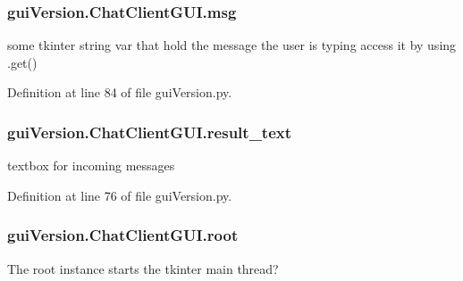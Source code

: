 \hypertarget{classgui_version_1_1_chat_client_g_u_i_a44a52021282a7dc6c04aa10b77d829e9}{}
\subsubsection[{msg}]{\setlength{\rightskip}{0pt plus 5cm}gui\+Version.\+Chat\+Client\+G\+U\+I.\+msg}\label{classgui_version_1_1_chat_client_g_u_i_a44a52021282a7dc6c04aa10b77d829e9}


some tkinter string var that hold the message the user is typing access it by using .get() 



Definition at line 84 of file gui\+Version.\+py.

\hypertarget{classgui_version_1_1_chat_client_g_u_i_aed7ce16822dd2da856987bb7dbca00f7}{}
\subsubsection[{result\+\_\+text}]{\setlength{\rightskip}{0pt plus 5cm}gui\+Version.\+Chat\+Client\+G\+U\+I.\+result\+\_\+text}\label{classgui_version_1_1_chat_client_g_u_i_aed7ce16822dd2da856987bb7dbca00f7}


textbox for incoming messages 



Definition at line 76 of file gui\+Version.\+py.

\hypertarget{classgui_version_1_1_chat_client_g_u_i_afec7497b20c1d133c5c026c9625a1691}{}
\subsubsection[{root}]{\setlength{\rightskip}{0pt plus 5cm}gui\+Version.\+Chat\+Client\+G\+U\+I.\+root}\label{classgui_version_1_1_chat_client_g_u_i_afec7497b20c1d133c5c026c9625a1691}


The root instance starts the tkinter main thread? 



